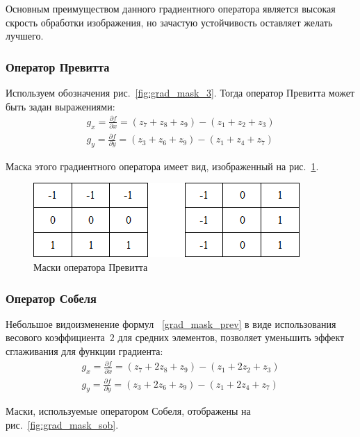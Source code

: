 \documentclass[12pt]{article} %
\begin{document}
Основным преимуществом данного градиентного оператора является высокая скрость обработки изображения, но зачастую устойчивость оставляет желать лучшего. 

\subsubsection{Оператор Превитта}

Используем обозначения рис.~\ref{fig:grad_mask_3}. Тогда оператор Превитта может быть задан выражениями:
\begin{gather}\label{grad_mask_prev}
	g_x = \frac{\partial f}{\partial x} = (z_7+z_8+z_9)-(z_1+z_2+z_3)\\
	g_y = \frac{\partial f}{\partial y} = (z_3+z_6+z_9)-(z_1+z_4+z_7)
\end{gather}

Маска этого градиентного оператора имеет вид, изображенный на рис.~\ref{fig:grad_mask_prev}.

\begin{figure}[h]
	
	\centering
	
	\includegraphics[width=0.4\linewidth]{grad_mask_prev.jpg}
	
	\caption{Маски оператора Превитта}
	
	\label{fig:grad_mask_prev}
	
\end{figure}

\subsubsection{Оператор Собеля}

Небольшое видоизменение формул ~\ref{grad_mask_prev} в виде использования весового коэффициента~$2$ для средних элементов, позволяет уменьшить эффект сглаживания для функции градиента:
\begin{gather}\label{grad_mask_sob}
	g_x = \frac{\partial f}{\partial x} = (z_7+2z_8+z_9)-(z_1+2z_2+z_3)\\
	g_y = \frac{\partial f}{\partial y} = (z_3+2z_6+z_9)-(z_1+2z_4+z_7)
\end{gather}

\newpage

Маски, используемые оператором Собеля, отображены на рис.~\ref{fig:grad_mask_sob}.
\end{document}
